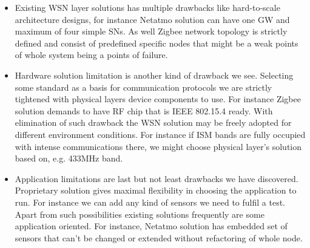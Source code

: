 \documentclass[journal]{IEEEtran}
\begin{document}
\begin {itemize}
\item Existing WSN layer solutions has multiple drawbacks like hard-to-scale architecture designs, for instance Netatmo solution can have one GW and maximum of four simple SNs. As well Zigbee network topology is strictly defined and consist of predefined specific nodes that might be a weak points of whole system being a points of failure.
\item Hardware solution limitation is another kind of drawback we see. Selecting some standard as a basis for communication protocols we are strictly tightened with physical layers device components to use. For instance Zigbee solution demands to have RF chip that is IEEE 802.15.4 ready. With elimination of such drawback the WSN solution may be freely adopted for different environment conditions. For instance if ISM bands are fully occupied with intense communications there, we might choose physical layer's solution based on, e.g. 433MHz band.
\item Application limitations are last but not least drawbacks we have discovered. Proprietary solution gives maximal flexibility in choosing the application to run. For instance we can add any kind of sensors we need to fulfil a test. Apart from such possibilities existing solutions frequently are some application oriented. For instance, Netatmo solution has embedded set of sensors that can't be changed or extended without refactoring of whole node.
\end {itemize}
\end{document}
